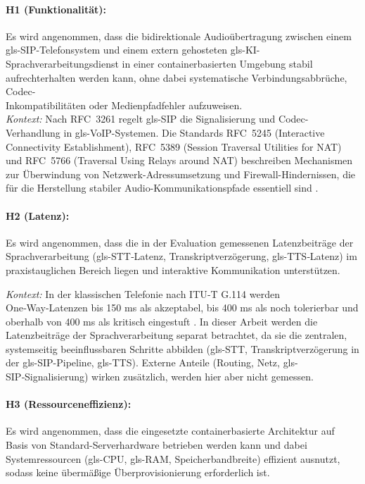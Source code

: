 \paragraph{H1 (Funktionalität):} Es wird angenommen, dass die bidirektionale Audioübertragung zwischen einem \gls{gls-SIP}-Telefonsystem und einem extern gehosteten \gls{gls-KI}-\\Sprachverarbeitungsdienst in einer containerbasierten Umgebung stabil aufrechterhalten werden kann, ohne dabei systematische Verbindungsabbrüche, Codec-\\Inkompatibilitäten oder Medienpfadfehler aufzuweisen.\\

\textit{Kontext:} Nach RFC~3261 regelt \gls{gls-SIP} die Signalisierung und Codec-Verhandlung in \gls{gls-VoIP}-Systemen. Die Standards RFC~5245 (Interactive Connectivity Establishment), RFC~5389 (Session Traversal Utilities for NAT) und RFC~5766 (Traversal Using Relays around NAT) beschreiben Mechanismen zur Überwindung von Netzwerk-Adressumsetzung und Firewall-Hindernissen, die für die Herstellung stabiler Audio-Kommunikationspfade essentiell sind \parencite{rfc3261,rfc5245,rfc5389,rfc5766}.

\paragraph{H2 (Latenz):} Es wird angenommen, dass die in der Evaluation gemessenen Latenzbeiträge der Sprachverarbeitung (\gls{gls-STT}‑Latenz, Transkriptverzögerung, \gls{gls-TTS}‑Latenz) im praxistauglichen Bereich liegen und interaktive Kommunikation unterstützen.

\textit{Kontext:} In der klassischen Telefonie nach ITU‑T G.114 werden One‑Way‑Latenzen bis 150 ms als akzeptabel, bis 400 ms als noch tolerierbar und oberhalb von 400 ms als kritisch eingestuft \parencite{ITU-T-G114}. In dieser Arbeit werden die Latenzbeiträge der Sprachverarbeitung separat betrachtet, da sie die zentralen, systemseitig beeinflussbaren Schritte abbilden (\gls{gls-STT}, Transkriptverzögerung in der \gls{gls-SIP}-Pipeline, \gls{gls-TTS}). Externe Anteile (Routing, Netz, \gls{gls-SIP}‑Signalisierung) wirken zusätzlich, werden hier aber nicht gemessen.

\paragraph{H3 (Ressourceneffizienz):} Es wird angenommen, dass die eingesetzte containerbasierte Architektur auf Basis von Standard-Serverhardware betrieben werden kann und dabei Systemressourcen (\gls{gls-CPU}, \gls{gls-RAM}, Speicherbandbreite) effizient ausnutzt, sodass keine übermä\ss ige Überprovisionierung erforderlich ist.

